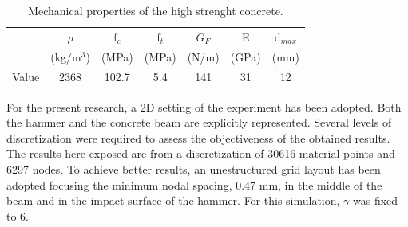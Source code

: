 \message{ !name(2020_EFM_MPM_Eigensoftening.tex)}\documentclass[preprint,12pt,a4paper]{elsarticle}
\begin{document}
\begin{table}
  \centering
  \begin{tabular}[]{c c c c c c c}
    \hline
      &   $\rho$   & $\text{f}_c$ & $\text{f}_t$ & $G_F$ &   E   & $\text{d}_{max}$ \\
      & (kg/m$^3$) &     (MPa)    &     (MPa)    & (N/m) & (GPa) & (mm) \\
    \hline
Value &    2368    &     102.7    &      5.4     &  141  &   31  &  12 \\
    \hline
  \end{tabular}
  \caption[Mechanical properties of thje concrete]{Mechanical
    properties of the high strenght concrete.}
  \label{tab:concrete-properties}
\end{table}
For the present research, a 2D setting of the experiment has been
adopted. Both the hammer and the concrete beam are explicitly
represented. Several levels of discretization were required to assess
the objectiveness of the obtained results. The results here exposed
are from a discretization of 30616 material points and 6297 nodes. To
achieve better results, an unestructured grid layout has been adopted
focusing the minimum nodal spacing, 0.47 mm, in the middle of the beam and in
the impact surface of the hammer. For this simulation, $\gamma$ was
fixed to 6.\\
\end{document}
